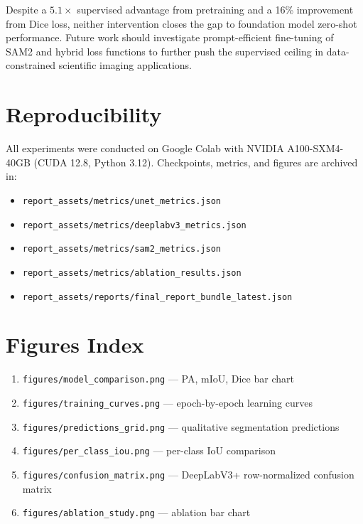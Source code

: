 \documentclass[11pt,a4paper]{article}
\begin{document}
Despite a $5.1\times$ supervised advantage from pretraining and a 16\% improvement from Dice loss, neither intervention closes the gap to foundation model zero-shot performance. Future work should investigate prompt-efficient fine-tuning of SAM2 and hybrid loss functions to further push the supervised ceiling in data-constrained scientific imaging applications.

\newpage
\appendix

\section{Reproducibility}

All experiments were conducted on Google Colab with NVIDIA A100-SXM4-40GB (CUDA 12.8, Python 3.12). Checkpoints, metrics, and figures are archived in:

\begin{itemize}
  \item \texttt{report\_assets/metrics/unet\_metrics.json}
  \item \texttt{report\_assets/metrics/deeplabv3\_metrics.json}
  \item \texttt{report\_assets/metrics/sam2\_metrics.json}
  \item \texttt{report\_assets/metrics/ablation\_results.json}
  \item \texttt{report\_assets/reports/final\_report\_bundle\_latest.json}
\end{itemize}

\section{Figures Index}

\begin{enumerate}
  \item \texttt{figures/model\_comparison.png} --- PA, mIoU, Dice bar chart
  \item \texttt{figures/training\_curves.png} --- epoch-by-epoch learning curves
  \item \texttt{figures/predictions\_grid.png} --- qualitative segmentation predictions
  \item \texttt{figures/per\_class\_iou.png} --- per-class IoU comparison
  \item \texttt{figures/confusion\_matrix.png} --- DeepLabV3+ row-normalized confusion matrix
  \item \texttt{figures/ablation\_study.png} --- ablation bar chart
\end{enumerate}
\end{document}
